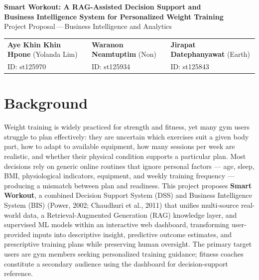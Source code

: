 \documentclass[11pt,a4paper]{article}
\begin{document}
\begin{center}
{\Large\bfseries Smart Workout: A RAG-Assisted Decision Support and \\[2pt]
Business Intelligence System for Personalized Weight Training}\\[6pt]
{\normalsize Project Proposal\,---\,Business Intelligence and Analytics}
\end{center}

\begin{center}
\small
\begin{tabular}{lll}
\textbf{Aye Khin Khin Hpone} (Yolanda Lim) & \textbf{Waranon Neamtuptim} (Non) & \textbf{Jirapat Datephanyawat} (Earth) \\
ID: st125970 & ID: st125934 & ID: st125843 \\
\end{tabular}
\end{center}

\section{Background}
Weight training is widely practiced for strength and fitness, yet many gym users struggle to plan effectively: they are uncertain which exercises suit a given body part, how to adapt to available equipment, how many sessions per week are realistic, and whether their physical condition supports a particular plan. Most decisions rely on generic online routines that ignore personal factors --- age, sleep, BMI, physiological indicators, equipment, and weekly training frequency --- producing a mismatch between plan and readiness. This project proposes \textbf{Smart Workout}, a combined Decision Support System (DSS) and Business Intelligence System (BIS) (Power, 2002; Chaudhuri et al., 2011) that unifies multi-source real-world data, a Retrieval-Augmented Generation (RAG) knowledge layer, and supervised ML models within an interactive web dashboard, transforming user-provided inputs into descriptive insight, predictive outcome estimates, and prescriptive training plans while preserving human oversight. The primary target users are gym members seeking personalized training guidance; fitness coaches constitute a secondary audience using the dashboard for decision-support reference.

\end{document}
